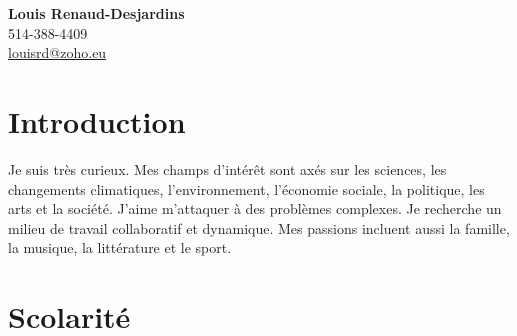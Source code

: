 \documentclass[paper=letter,fontsize=11pt]{scrartcl} %
\begin{document}

\begin{flushright}
{\huge \textbf{Louis Renaud-Desjardins}}\\
{\Large 514-388-4409}\\
{\Large \href{mailto:louisrd@zoho.eu}{louisrd@zoho.eu}}
\end{flushright}








\section*{Introduction}

\noindent Je suis très curieux. Mes champs d’intérêt sont axés sur les sciences, les changements climatiques, l’environnement, l’économie sociale, la politique, les arts et la société. J'aime m'attaquer à des problèmes complexes. Je recherche un milieu de travail collaboratif et dynamique. Mes passions incluent aussi la famille, la musique, la littérature et le sport.


\section*{Scolarité}
\end{document}
